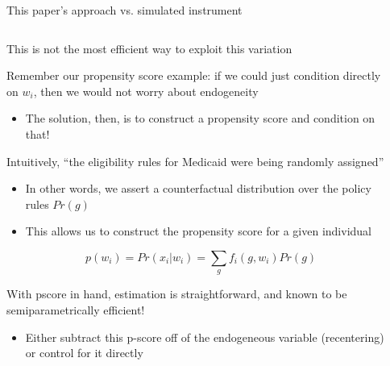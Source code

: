 \documentclass[notes,11pt, aspectratio=169]{beamer}
\newenvironment{wideitemize}{\itemize\addtolength{\itemsep}{10pt}}{\enditemize}
\begin{document}
\begin{frame}{This paper's approach vs. simulated instrument}
\begin{columns}[T] %
\begin{column}{.9\textwidth}
  \begin{wideitemize}
  \item This is not the most efficient way to exploit this variation
  \item Remember our propensity score example: if we could just
    condition directly on $w_{i}$, then we would not worry about
    endogeneity
    \begin{itemize}
    \item The solution, then, is to construct a propensity score and condition on that!
    \end{itemize}
  \item Intuitively, ``the eligibility rules for Medicaid were being randomly assigned''
    \begin{itemize}
    \item In other words, we assert a counterfactual distribution over
      the policy rules $Pr(g)$
    \item This allows us to construct the propensity score for a given individual
    \end{itemize}
    \begin{equation*}
      p(w_{i}) = Pr(x_{i} | w_{i}) = \sum_{g} f_{i}(g, w_{i}) Pr(g)
    \end{equation*}
  \item With pscore in hand, estimation is straightforward, and known to be semiparametrically efficient!
    \begin{itemize}
    \item Either subtract this p-score off of the endogeneous variable
      (recentering) or control for it directly
    \end{itemize}
  \end{wideitemize}
\end{column}%
\hfill%
\begin{column}{.25\textwidth}
\end{column}%
\end{columns}
\end{frame}
\end{document}

